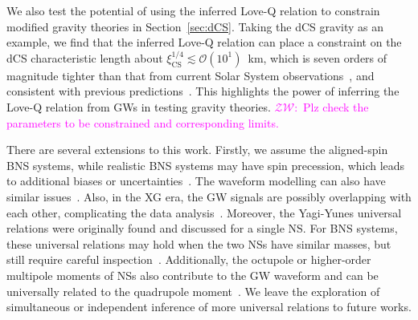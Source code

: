 \documentclass[a4paper,11pt]{article}
\newcommand{\ZW}[1]{\textcolor{magenta}{$\mathcal{ZW}$:~#1}}
\begin{document}
We also test the potential of using the inferred Love-Q relation to
constrain modified gravity theories in Section~\ref{sec:dCS}.
Taking the dCS gravity as an example, we find that the inferred Love-Q relation
can place a constraint on the dCS characteristic length about
$\xi_{\mathrm{CS}}^{1/4} \lesssim \mathcal{O}(10^1)$~km, which is seven orders
of magnitude tighter than that from current Solar System
observations~\cite{Ali-Haimoud:2011zme,Yagi:2012ya}, and consistent with
previous predictions~\cite{Yagi:2013bca,Yagi:2013awa}. This highlights the power
of inferring the Love-Q relation from GWs in testing gravity theories. \ZW{Plz
check the parameters to be constrained and corresponding limits.}

There are several extensions to this work. Firstly, we assume the aligned-spin BNS systems, while
realistic BNS systems may have spin precession, which leads to additional
biases or uncertainties~\cite{Williamson:2017evr}. The waveform modelling can
also have similar issues~\cite{Purrer:2019jcp,Gamba:2020wgg}. 
Also, in the XG era, the GW signals are possibly overlapping with each
other, complicating the data analysis~\cite{Pizzati:2021apa, Samajdar:2021egv,
Wang:2023ldq, Johnson:2024foj, Wang:2025ckw}.
Moreover, the Yagi-Yunes universal relations were originally found and discussed
for a single NS. For BNS systems, these universal relations may hold when the
two NSs have similar masses, but still require careful
inspection~\cite{Shao:2022koz, Saffer:2021gak}. Additionally, the octupole or
higher-order multipole moments of NSs also contribute to the GW waveform and can
be universally related to the quadrupole moment~\cite{Yagi_2017,Abac:2023ujg}.
We leave the exploration of simultaneous or independent inference of more
universal relations to future works.

\acknowledgments

\clearpage


% 

\end{document}
